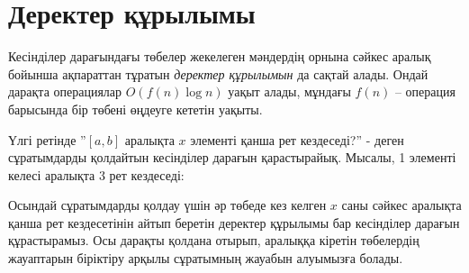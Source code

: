 
\section{Деректер құрылымы}

Кесінділер дарағындағы төбелер 
жекелеген мәндердің орнына сәйкес аралық бойынша ақпараттан тұратын  
\emph{деректер құрылымын} да сақтай алады.
Ондай дарақта операциялар $O(f(n) \log n)$ уақыт алады,
мұндағы $f(n)$ -- операция барысында бір төбені өңдеуге кететін уақыты. 


Үлгі ретінде ''$[a,b]$ аралықта $x$ элементі қанша рет кездеседі?'' -
деген сұратымдарды қолдайтын кесінділер дарағын қарастырайық.
Мысалы, 1 элементі келесі аралықта 3 рет кездеседі:


\begin{center}
\end{center}

Осындай сұратымдарды қолдау үшін 
әр төбеде кез келген $x$ саны сәйкес аралықта қанша рет 
кездесетінін айтып беретін деректер құрылымы бар
кесінділер дарағын құрастырамыз. Осы дарақты қолдана отырып, аралыққа кіретін төбелердің жауаптарын 
біріктіру арқылы сұратымның жауабын алуымызға болады. 

